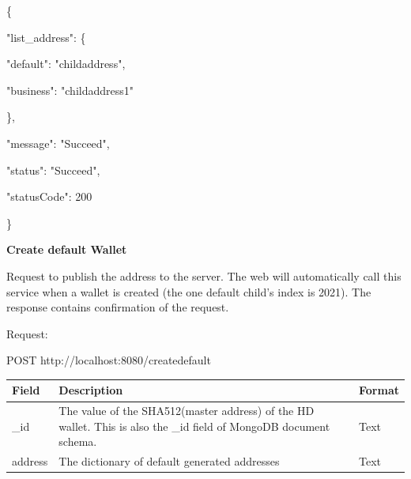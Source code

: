 \begin{framed}
    \hspace*{13mm}        \{\par
    \hspace*{13mm}          "list\_address": \{ \par
    \hspace*{18mm}        "default": "childaddress", \par
    \hspace*{18mm}        "business": "childaddress1"    \par
    \hspace*{18mm}        \},\par
    \hspace*{13mm}                "message": "Succeed",   \par
    \hspace*{13mm}                "status": "Succeed",  \par
    \hspace*{13mm}             "statusCode": 200   \par
    \hspace*{13mm}                 \}    \par

\end{framed}
    
\bigskip
{\textbf{Create default Wallet}}
\bigskip

Request to publish the address to the server. The web will automatically call this service when a wallet is created (the one default child’s index is 2021). The response contains confirmation of the request.

Request:

\begin{framed}
    POST http://localhost:8080/createdefault
\end{framed}

\begin{tabular}{| m{3cm} | m{9cm} | m{2.6cm} |}
    \hline
    Field & Description & Format                                            \\ \hline
    \_id & The value of the SHA512(master address) of the HD wallet. This is also the \_id field of MongoDB document schema.  & Text   \\ \hline
    address   & The dictionary of default generated addresses & Text    \\ \hline
\end{tabular}
\bigskip

